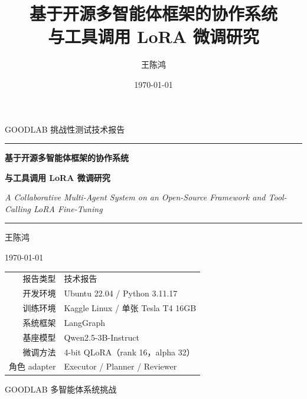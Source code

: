 \documentclass[UTF8,a4paper,12pt]{ctexart}
\title{基于开源多智能体框架的协作系统\\与工具调用 LoRA 微调研究}
\author{王陈鸿}
\date{\today}
\begin{document}
\begin{titlepage}
  \thispagestyle{empty}
  \centering
  \vspace*{1.6cm}

  {\large GOODLAB 挑战性测试技术报告\par}
  \vspace{1.0cm}
  \rule{0.72\linewidth}{0.4pt}\par
  \vspace{1.0cm}

  {\Huge\bfseries 基于开源多智能体框架的协作系统\par}
  \vspace{0.45cm}
  {\Huge\bfseries 与工具调用 LoRA 微调研究\par}
  \vspace{0.7cm}
  {\large\itshape A Collaborative Multi-Agent System on an Open-Source
  Framework and Tool-Calling LoRA Fine-Tuning\par}

  \vspace{1.2cm}
  \rule{0.72\linewidth}{0.4pt}\par

  \vspace{1.8cm}
  {\Large 王陈鸿\par}
  \vspace{0.5cm}
  {\large \today\par}

  \vfill
  \begin{tabular}{rl}
    报告类型 & 技术报告 \\
    开发环境 & Ubuntu 22.04 / Python 3.11.17 \\
    训练环境 & Kaggle Linux / 单张 Tesla T4 16GB \\
    系统框架 & LangGraph \\
    基座模型 & Qwen2.5-3B-Instruct \\
    微调方法 & 4-bit QLoRA（rank 16，alpha 32） \\
    角色 adapter & Executor / Planner / Reviewer \\
  \end{tabular}
  \vfill

  {\small GOODLAB 多智能体系统挑战\par}
\end{titlepage}

\end{document}
